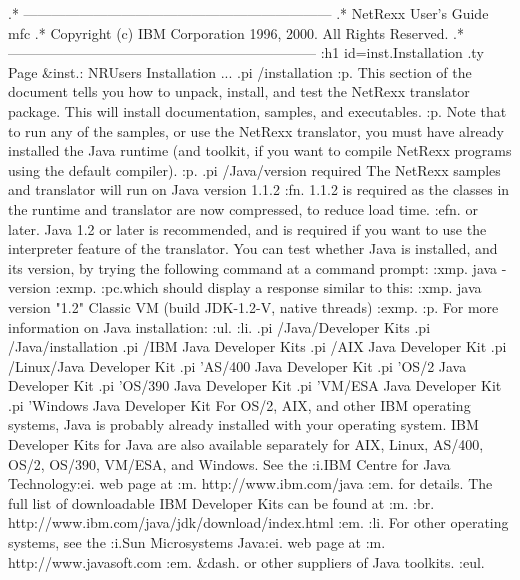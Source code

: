 .* ------------------------------------------------------------------
.* NetRexx User's Guide                                              mfc
.* Copyright (c) IBM Corporation 1996, 2000.  All Rights Reserved.
.* ------------------------------------------------------------------
:h1 id=inst.Installation
.ty Page &inst.: NRUsers Installation ...
.pi /installation
:p.
This section of the document tells you how to unpack, install, and test
the NetRexx translator package.  This will install documentation,
samples, and executables.
:p.
Note that to run any of the samples, or use the NetRexx translator, you
must have already installed the Java runtime (and toolkit, if you want
to compile NetRexx programs using the default compiler).
:p.
.pi /Java/version required
The NetRexx samples and translator will run on Java version 1.1.2
:fn.
1.1.2 is required as the classes in the runtime and translator are now
compressed, to reduce load time.
:efn.
or later.  Java 1.2 or later is recommended, and is required if you want
to use the interpreter feature of the translator.
You can test whether Java is installed, and its version, by trying the
following command at a command prompt:
:xmp.
java -version
:exmp.
:pc.which should display a response similar to this:
:xmp.
java version "1.2"
Classic VM (build JDK-1.2-V, native threads)
:exmp.
:p.
For more information on Java installation:
:ul.
:li.
.pi /Java/Developer Kits
.pi /Java/installation
.pi /IBM Java Developer Kits
.pi /AIX Java Developer Kit
.pi /Linux/Java Developer Kit
.pi 'AS/400 Java Developer Kit
.pi 'OS/2 Java Developer Kit
.pi 'OS/390 Java Developer Kit
.pi 'VM/ESA Java Developer Kit
.pi 'Windows Java Developer Kit
For OS/2, AIX, and other IBM operating systems, Java is probably already
installed with your operating system.  IBM Developer Kits for Java are
also available separately for AIX, Linux, AS/400, OS/2, OS/390, VM/ESA,
and Windows.
See the :i.IBM Centre for
Java Technology:ei. web page at :m.
http://www.ibm.com/java
:em. for details.
The full list of downloadable IBM Developer Kits can be found at :m.
:br.
http://www.ibm.com/java/jdk/download/index.html
:em.
:li.
For other operating systems, see the :i.Sun Microsystems Java:ei. web
page at :m.
http://www.javasoft.com
:em. &dash. or other suppliers of Java toolkits.
:eul.
